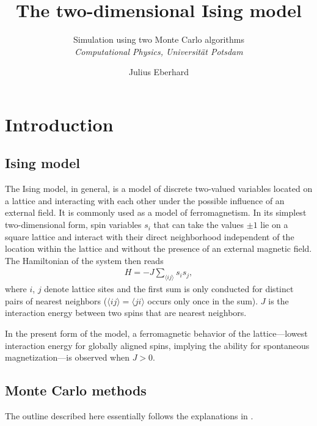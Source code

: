 \documentclass[fleqn]{scrartcl}
\title{The two-dimensional Ising model}
\subtitle{\vspace{12pt}Simulation using two Monte Carlo algorithms\\\textit{Computational Physics, Universit\"at Potsdam}}
\author{Julius Eberhard}
\begin{document}
\maketitle

\section{Introduction}

\subsection{Ising model}

The Ising model, in general, is a model of discrete two-valued variables located on a lattice and interacting with each other under the possible influence of an external field.
It is commonly used as a model of ferromagnetism.
In its simplest two-dimensional form, spin variables $s_i$ that can take the values $\pm 1$ lie on a square lattice and interact with their direct neighborhood independent of the location within the lattice and without the presence of an external magnetic field.
The Hamiltonian of the system then reads
%
\begin{align*}
  H = -J \sum_{\langle i j \rangle} s_i s_j,
\end{align*}
%
where $i$, $j$ denote lattice sites and the first sum is only conducted for distinct pairs of nearest neighbors ($\langle i j \rangle = \langle j i \rangle$ occurs only once in the sum).
$J$ is the interaction energy between two spins that are nearest neighbors.

In the present form of the model, a ferromagnetic behavior of the lattice---lowest interaction energy for globally aligned spins, implying the ability for spontaneous magnet\-ization---is observed when $J > 0$.

\newpage
\subsection{Monte Carlo methods}

The outline described here essentially follows the explanations in \cite{newman99}.
\end{document}
